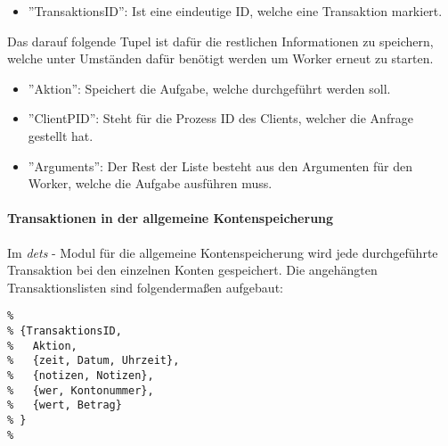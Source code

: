 \begin{itemize}
	\item ''TransaktionsID'': Ist eine eindeutige ID, welche eine Transaktion markiert.
\end{itemize}
Das darauf folgende Tupel ist dafür die restlichen Informationen zu speichern, welche unter Umständen dafür benötigt werden um Worker erneut zu starten.
\begin{itemize}
	\item ''Aktion'': Speichert die Aufgabe, welche durchgeführt werden soll.
	\item ''ClientPID'': Steht für die Prozess ID des Clients, welcher die Anfrage gestellt hat.
	\item ''Arguments'': Der Rest der Liste besteht aus den Argumenten für den Worker, welche die Aufgabe ausführen muss.
\end{itemize}

\paragraph{Transaktionen in der allgemeine Kontenspeicherung}

Im \textit{dets} - Modul für die allgemeine Kontenspeicherung wird jede durchgeführte Transaktion bei den einzelnen Konten gespeichert. Die angehängten Transaktionslisten sind folgendermaßen aufgebaut:

\begin{lstlisting}
% 
% {TransaktionsID,
%	Aktion,
%	{zeit, Datum, Uhrzeit},
%	{notizen, Notizen},
%	{wer, Kontonummer},
%	{wert, Betrag}
% }
%  
\end{lstlisting}

